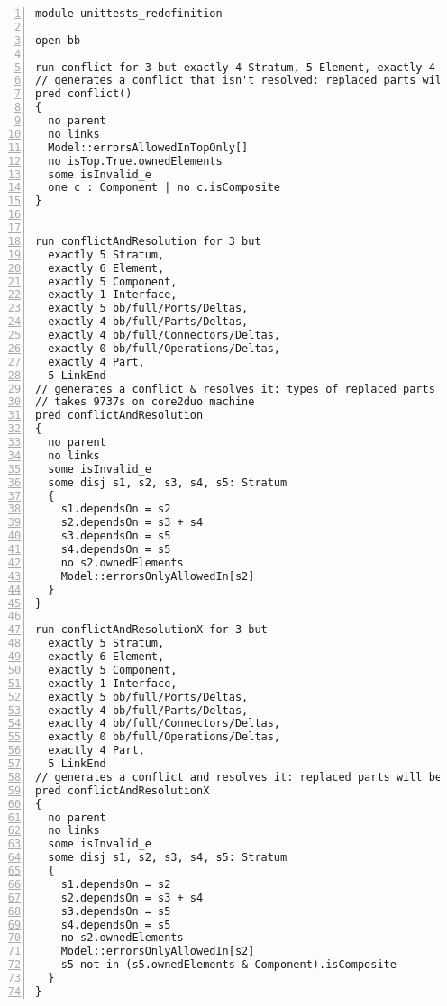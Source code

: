 \lstset{frame=tb, aboveskip=12pt, belowskip=-3pt, breaklines=true, tabsize=2, mathescape=true}
\begin{lstlisting}[caption={unittests\_conflict.als}, numbers=left]
module unittests_redefinition

open bb

run conflict for 3 but exactly 4 Stratum, 5 Element, exactly 4 Component, exactly 1 Interface, 4 bb/full/Ports/Deltas -- , exactly 1 Index
// generates a conflict that isn't resolved: replaced parts will be the same.  runs in about 197395ms
pred conflict()
{
  no parent
  no links
  Model::errorsAllowedInTopOnly[]  
  no isTop.True.ownedElements
  some isInvalid_e
  one c : Component | no c.isComposite
}


run conflictAndResolution for 3 but
  exactly 5 Stratum,
  exactly 6 Element,
  exactly 5 Component,
  exactly 1 Interface,
  exactly 5 bb/full/Ports/Deltas,
  exactly 4 bb/full/Parts/Deltas,
  exactly 4 bb/full/Connectors/Deltas,
  exactly 0 bb/full/Operations/Deltas,
  exactly 4 Part,
  5 LinkEnd
// generates a conflict & resolves it: types of replaced parts will be the same.
// takes 9737s on core2duo machine
pred conflictAndResolution
{
  no parent
  no links
  some isInvalid_e
  some disj s1, s2, s3, s4, s5: Stratum
  {
    s1.dependsOn = s2
    s2.dependsOn = s3 + s4
    s3.dependsOn = s5
    s4.dependsOn = s5
    no s2.ownedElements
    Model::errorsOnlyAllowedIn[s2]
  }
}

run conflictAndResolutionX for 3 but
  exactly 5 Stratum,
  exactly 6 Element,
  exactly 5 Component,
  exactly 1 Interface,
  exactly 5 bb/full/Ports/Deltas,
  exactly 4 bb/full/Parts/Deltas,
  exactly 4 bb/full/Connectors/Deltas,
  exactly 0 bb/full/Operations/Deltas,
  exactly 4 Part,
  5 LinkEnd
// generates a conflict and resolves it: replaced parts will be the same.  runs in 9737863ms
pred conflictAndResolutionX
{
  no parent
  no links
  some isInvalid_e
  some disj s1, s2, s3, s4, s5: Stratum
  {
    s1.dependsOn = s2
    s2.dependsOn = s3 + s4
    s3.dependsOn = s5
    s4.dependsOn = s5
    no s2.ownedElements
    Model::errorsOnlyAllowedIn[s2]
    s5 not in (s5.ownedElements & Component).isComposite
  }
}
\end{lstlisting}
